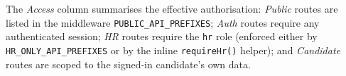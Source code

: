 The \emph{Access} column summarises the effective authorisation: \emph{Public}
routes are listed in the middleware \texttt{PUBLIC\_API\_PREFIXES}; \emph{Auth}
routes require any authenticated session; \emph{HR} routes require the
\texttt{hr} role (enforced either by \texttt{HR\_ONLY\_API\_PREFIXES} or by the
inline \texttt{requireHr()} helper); and \emph{Candidate} routes are scoped to
the signed-in candidate's own data.
